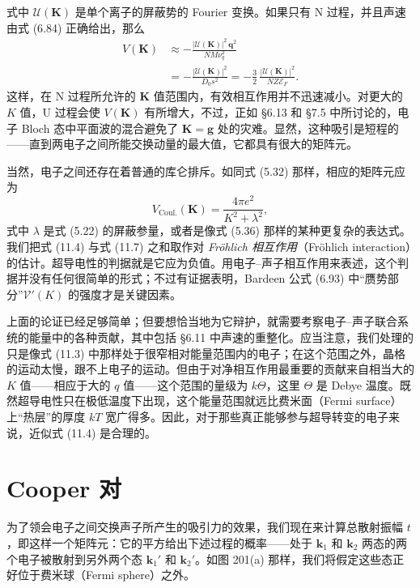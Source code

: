 式中 $\mathcal{U}(\mathbf{K})$ 是单个离子的屏蔽势的 Fourier 变换。如果只有 N 过程，并且声速由式 (6.84) 正确给出，那么
\begin{align*}
V(\mathbf{K}) &\approx-\frac{|\mathcal{U}(\mathbf{K})|^{2}\,\mathbf{q}^{2}}{NM\nu_{q}^{2}}\\
&=-\frac{|\mathcal{U}(\mathbf{K})|^{2}}{D_{0}s^{2}}=-\frac{3}{2}\,\frac{|\mathcal{U}(\mathbf{K})|^{2}}{NZ\mathcal{E}_{F}}.
\tag{11.6}
\end{align*}
这样，在 N 过程所允许的 $\mathbf{K}$ 值范围内，有效相互作用并不迅速减小。对更大的 $K$ 值，U 过程会使 $V(\mathbf{K})$ 有所增大，不过，正如 §6.13 和 §7.5 中所讨论的，电子 Bloch 态中平面波的混合避免了 $\mathbf{K}=\mathbf{g}$ 处的灾难。显然，这种吸引是短程的——直到两电子之间所能交换动量的最大值，它都具有很大的矩阵元。

当然，电子之间还存在着普通的库仑排斥。如同式 (5.32) 那样，相应的矩阵元应为
\begin{equation*}
V_{\mathrm{Coul.}}(\mathbf{K})=\frac{4\pi e^{2}}{K^{2}+\lambda^{2}},
\tag{11.7}
\end{equation*}
式中 $\lambda$ 是式 (5.22) 的屏蔽参量，或者是像式 (5.36) 那样的某种更复杂的表达式。我们把式 (11.4) 与式 (11.7) 之和取作对 \emph{Fröhlich 相互作用}（Fröhlich interaction）的估计。超导电性的判据就是它应为负值。用电子–声子相互作用来表述，这个判据并没有任何很简单的形式；不过有证据表明，Bardeen 公式 (6.93) 中“赝势部分”$\mathcal{V}'(K)$ 的强度才是关键因素。

上面的论证已经足够简单；但要想恰当地为它辩护，就需要考察电子–声子联合系统的能量中的各种贡献，其中包括 §6.11 中声速的重整化。应当注意，我们处理的只是像式 (11.3) 中那样处于很窄相对能量范围内的电子；在这个范围之外，晶格的运动太慢，跟不上电子的运动。但由于对净相互作用最重要的贡献来自相当大的 $K$ 值——相应于大的 $q$ 值——这个范围的量级为 $k\Theta$，这里 $\Theta$ 是 Debye 温度。既然超导电性只在极低温度下出现，这个能量范围就远比费米面（Fermi surface）上“热层”的厚度 $kT$ 宽广得多。因此，对于那些真正能够参与超导转变的电子来说，近似式 (11.4) 是合理的。

\section{Cooper 对}

为了领会电子之间交换声子所产生的吸引力的效果，我们现在来计算总散射振幅 $t$，即这样一个矩阵元：它的平方给出下述过程的概率——处于 $\mathbf{k}_1$ 和 $\mathbf{k}_2$ 两态的两个电子被散射到另外两个态 $\mathbf{k}_1'$ 和 $\mathbf{k}_2'$。如图 201(a) 那样，我们将假定这些态正好位于费米球（Fermi sphere）之外。


